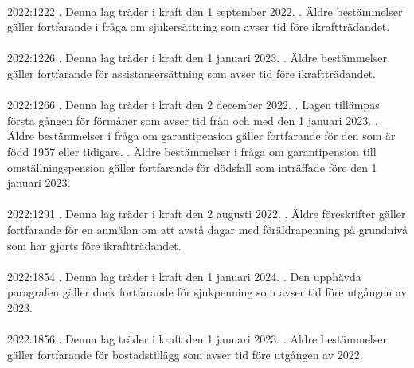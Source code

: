 \documentclass[a4paper,notitlepage,openany,10pt]{book}
\begin{document}
\paragraph*{}
2022:1222
. Denna lag träder i kraft den 1 september 2022.
. Äldre bestämmelser gäller fortfarande i fråga om sjukersättning som avser tid före ikraftträdandet.
\paragraph*{}
2022:1226
. Denna lag träder i kraft den 1 januari 2023.
. Äldre bestämmelser gäller fortfarande för assistansersättning som avser tid före ikraftträdandet.
\paragraph*{}
2022:1266
. Denna lag träder i kraft den 2 december 2022.
. Lagen tillämpas första gången för förmåner som avser tid från och med den 1 januari 2023.
. Äldre bestämmelser i fråga om garantipension gäller fortfarande för den som är född 1957 eller tidigare.
. Äldre bestämmelser i fråga om garantipension till omställningspension gäller fortfarande för dödsfall som inträffade före den 1 januari 2023.
\paragraph*{}
2022:1291
. Denna lag träder i kraft den 2 augusti 2022.
. Äldre föreskrifter gäller fortfarande för en anmälan om att avstå dagar med föräldrapenning på grundnivå som har gjorts före ikraftträdandet.
\paragraph*{}
2022:1854
. Denna lag träder i kraft den 1 januari 2024.
. Den upphävda paragrafen gäller dock fortfarande för sjukpenning som avser tid före utgången av 2023.
\paragraph*{}
2022:1856
. Denna lag träder i kraft den 1 januari 2023.
. Äldre bestämmelser gäller fortfarande för bostadstillägg som avser tid före utgången av 2022.
\end{document}
